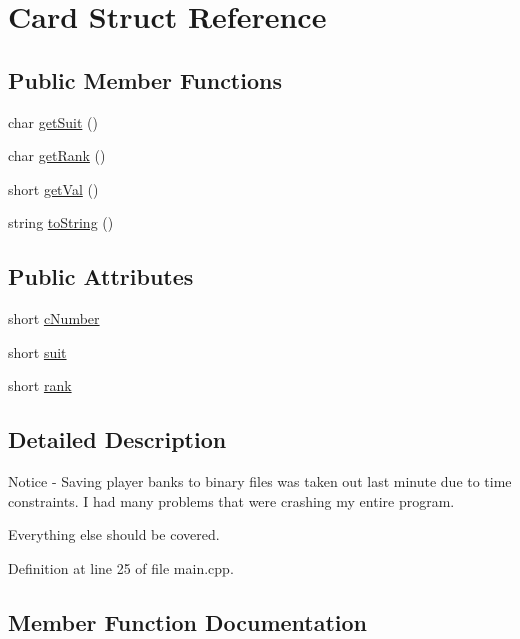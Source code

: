 \hypertarget{struct_card}{}\section{Card Struct Reference}
\label{struct_card}
\subsection*{Public Member Functions}
\begin{DoxyCompactItemize}
\item 
char \hyperlink{struct_card_abfb09282f9920c235b464fb7f714b56c}{get\+Suit} ()
\item 
char \hyperlink{struct_card_ae9962bedaae46470f4f50296d8dbe3d4}{get\+Rank} ()
\item 
short \hyperlink{struct_card_a41988c6dbc3695f9cb734cfc0855cf21}{get\+Val} ()
\item 
string \hyperlink{struct_card_a40725f94d140308b3ec535ad00fd033d}{to\+String} ()
\end{DoxyCompactItemize}
\subsection*{Public Attributes}
\begin{DoxyCompactItemize}
\item 
short \hyperlink{struct_card_a564ce6f9b22bb66a4055fbf2a7a79347}{c\+Number}
\item 
short \hyperlink{struct_card_adbbdc45f711b78c1e08aecfb6e079d3d}{suit}
\item 
short \hyperlink{struct_card_a8045fdfbf3c5a7e77276266df90cf9e0}{rank}
\end{DoxyCompactItemize}


\subsection{Detailed Description}
Notice -\/ Saving player banks to binary files was taken out last minute due to time constraints. I had many problems that were crashing my entire program.

Everything else should be covered. 

Definition at line 25 of file main.\+cpp.



\subsection{Member Function Documentation}
